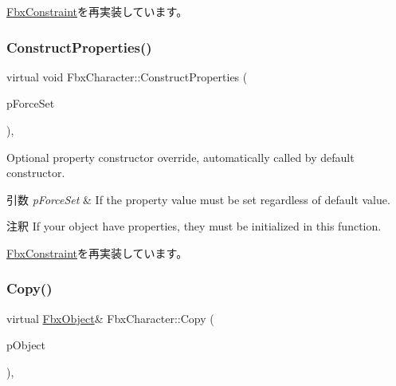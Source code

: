 \hyperlink{class_fbx_constraint_a6350b98fa8717caf9167c5513824310c}{Fbx\+Constraint}を再実装しています。

\mbox{\label{class_fbx_character_ae66db4ff3c527db3c47064c700ce179a}} 
\subsubsection{\texorpdfstring{Construct\+Properties()}{ConstructProperties()}}
{\footnotesize\ttfamily virtual void Fbx\+Character\+::\+Construct\+Properties (\begin{DoxyParamCaption}\item[{bool}]{p\+Force\+Set }\end{DoxyParamCaption})\hspace{0.3cm}{\ttfamily [protected]}, {\ttfamily [virtual]}}

Optional property constructor override, automatically called by default constructor. 
\begin{DoxyParams}{引数}
{\em p\+Force\+Set} & If the property value must be set regardless of default value. \\
\hline
\end{DoxyParams}
\begin{DoxyRemark}{注釈}
If your object have properties, they must be initialized in this function. 
\end{DoxyRemark}


\hyperlink{class_fbx_constraint_a0470a25b813b337d07a03ce4b97b44f8}{Fbx\+Constraint}を再実装しています。

\mbox{\label{class_fbx_character_a54ea68d64fe0dc2e052e2b5e475fa170}} 
\subsubsection{\texorpdfstring{Copy()}{Copy()}}
{\footnotesize\ttfamily virtual \hyperlink{class_fbx_object}{Fbx\+Object}\& Fbx\+Character\+::\+Copy (\begin{DoxyParamCaption}\item[{const \hyperlink{class_fbx_object}{Fbx\+Object} \&}]{p\+Object }\end{DoxyParamCaption})\hspace{0.3cm}{\ttfamily [protected]}, {\ttfamily [virtual]}}

